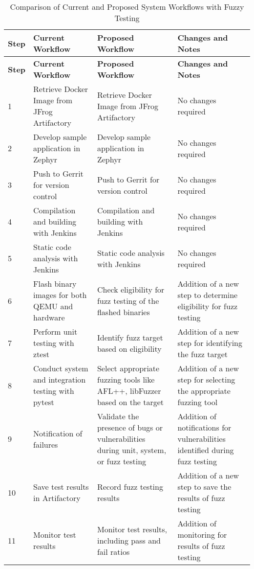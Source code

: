 \begin{longtable}{p{1cm}p{3.7cm}p{3.7cm}p{3.7cm}}
\caption{Comparison of Current and Proposed System Workflows with Fuzzy Testing}
\label{tab:system_workflows_comparison_fuzzy} \\
\toprule
\textbf{Step} & \textbf{Current Workflow} & \textbf{Proposed Workflow} & \textbf{Changes and Notes} \\
\midrule
\endfirsthead

\toprule
\textbf{Step} & \textbf{Current Workflow} & \textbf{Proposed Workflow} & \textbf{Changes and Notes} \\
\midrule
\endhead

1 & Retrieve Docker Image from JFrog Artifactory & Retrieve Docker Image from JFrog Artifactory & No changes required \\
\midrule
2 & Develop sample application in Zephyr & Develop sample application in Zephyr & No changes required \\
\midrule
3 & Push to Gerrit for version control & Push to Gerrit for version control & No changes required \\
\midrule
4 & Compilation and building with Jenkins & Compilation and building with Jenkins & No changes required \\
\midrule
5 & Static code analysis with Jenkins & Static code analysis with Jenkins & No changes required \\
\midrule
6 & Flash binary images for both QEMU and hardware & Check eligibility for fuzz testing of the flashed binaries & Addition of a new step to determine eligibility for fuzz testing \\
\midrule
7 & Perform unit testing with ztest & Identify fuzz target based on eligibility & Addition of a new step for identifying the fuzz target \\
\midrule
8 & Conduct system and integration testing with pytest & Select appropriate fuzzing tools like AFL++, libFuzzer based on the target & Addition of a new step for selecting the appropriate fuzzing tool \\
\midrule
9 & Notification of failures & Validate the presence of bugs or vulnerabilities during unit, system, or fuzz testing & Addition of notifications for vulnerabilities identified during fuzz testing \\
\midrule
10 & Save test results in Artifactory & Record fuzz testing results & Addition of a new step to save the results of fuzz testing \\
\midrule
11 & Monitor test results & Monitor test results, including pass and fail ratios & Addition of monitoring for results of fuzz testing \\
\bottomrule
\end{longtable}



